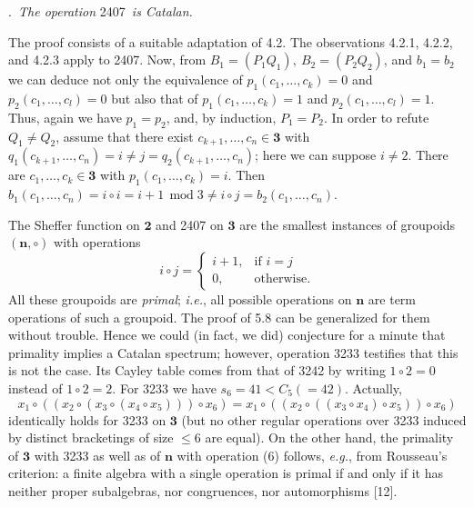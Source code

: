 \documentclass[a4paper,reqno]{amsart}\usepackage{amssymb,latexsym}
\theoremstyle{definition}
\theoremstyle{remark}
\numberwithin{equation}{section}
\numberwithin{theorem}{section}
\begin{document}
\bigskip

.\textit{\ The operation }2407\textit{\ is Catalan.}

\smallskip

The proof consists of a suitable adaptation of 4.2. The observations 4.2.1,
4.2.2, and 4.2.3 apply to 2407. Now, from $B_{1}=(P_{1}Q_{1}),~B_{2}=(P_{2}Q_{2})$, and $b_{1}=b_{2}$ we can deduce not only the equivalence of
$p_{1}(c_{1},\ldots,c_{k})=0$ and $p_{2}(c_{1},\ldots,c_{l})=0$ but also that
of $p_{1}(c_{1},\ldots,c_{k})=1$ and $p_{2}(c_{1},\ldots,c_{l})=1$. Thus,
again we have $p_{1}=p_{2}$, and, by induction, $P_{1}=P_{2}$. In order to
refute $Q_{1}\neq Q_{2}$, assume that there exist $c_{k+1},\ldots,c_{n}\in\mathbf{3}$ with $q_{1}(c_{k+1},\ldots,c_{n})=i\neq j=q_{2}(c_{k+1},\ldots,c_{n})$; here we can suppose $i\neq2$. There are $c_{1},\ldots
,c_{k}\in\mathbf{3}$ with $p_{1}(c_{1},\ldots,c_{k})=i$. Then $b_{1}(c_{1},\ldots,c_{n})=i\circ i=i+1\,\operatorname{mod}3\neq i\circ
j=b_{2}(c_{1},\ldots,c_{n})$.

\smallskip

The Sheffer function on $\mathbf{2}$ and 2407 on $\mathbf{3}$ are the smallest
instances of groupoids $(\mathbf{n},\circ)$ with operations\begin{equation}
i\circ j=\begin{cases}
i+1, & \text{if }i=j\\
0, & \text{otherwise.}\end{cases}
\tag{6}\end{equation}
All these groupoids are \textit{primal}\thinspace; \textit{i.e.}, all possible
operations on $\mathbf{n}$ are term operations of such a groupoid. The proof
of 5.8 can be generalized for them without trouble. Hence we could (in fact,
we did) conjecture for a minute that primality implies a Catalan spectrum;
however, operation 3233 testifies that this is not the case. Its Cayley table
comes from that of 3242 by writing $1\circ2=0$ instead of $1\circ2=2$. For
3233 we have $s_{6}=41<C_{5}(=42)$. Actually,\[
x_{1}\circ\left(  \left(  x_{2}\circ\left(  x_{3}\circ\left(  x_{4}\circ
x_{5}\right)  \right)  \right)  \circ x_{6}\right)  =x_{1}\circ\left(  \left(
x_{2}\circ\left(  \left(  x_{3}\circ x_{4}\right)  \circ x_{5}\right)
\right)  \circ x_{6}\right)
\]
identically holds for 3233 on $\mathbf{3}$ (but no other regular operations
over 3233 induced by distinct bracketings of size $\leq6$ are equal). On the
other hand, the primality of $\mathbf{3}$ with 3233 as well as of $\mathbf{n}$
with operation (6) follows, \textit{e.g.}, from Rousseau's criterion: a finite
algebra with a single operation is primal if and only if it has neither proper
subalgebras, nor congruences, nor automorphisms [12].
\end{document}
